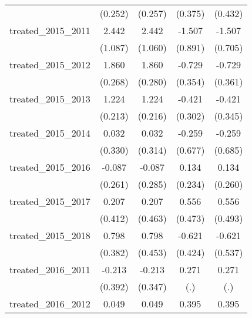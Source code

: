 {\begin{tabular}{l*{4}{c}}
            &     (0.252)         &     (0.257)         &     (0.375)         &     (0.432)         \\
[1em]
treated\_2015\_2011&       2.442\sym{*}  &       2.442\sym{*}  &      -1.507         &      -1.507\sym{*}  \\
            &     (1.087)         &     (1.060)         &     (0.891)         &     (0.705)         \\
[1em]
treated\_2015\_2012&       1.860\sym{***}&       1.860\sym{***}&      -0.729\sym{*}  &      -0.729\sym{*}  \\
            &     (0.268)         &     (0.280)         &     (0.354)         &     (0.361)         \\
[1em]
treated\_2015\_2013&       1.224\sym{***}&       1.224\sym{***}&      -0.421         &      -0.421         \\
            &     (0.213)         &     (0.216)         &     (0.302)         &     (0.345)         \\
[1em]
treated\_2015\_2014&       0.032         &       0.032         &      -0.259         &      -0.259         \\
            &     (0.330)         &     (0.314)         &     (0.677)         &     (0.685)         \\
[1em]
treated\_2015\_2016&      -0.087         &      -0.087         &       0.134         &       0.134         \\
            &     (0.261)         &     (0.285)         &     (0.234)         &     (0.260)         \\
[1em]
treated\_2015\_2017&       0.207         &       0.207         &       0.556         &       0.556         \\
            &     (0.412)         &     (0.463)         &     (0.473)         &     (0.493)         \\
[1em]
treated\_2015\_2018&       0.798\sym{*}  &       0.798         &      -0.621         &      -0.621         \\
            &     (0.382)         &     (0.453)         &     (0.424)         &     (0.537)         \\
[1em]
treated\_2016\_2011&      -0.213         &      -0.213         &       0.271         &       0.271         \\
            &     (0.392)         &     (0.347)         &         (.)         &         (.)         \\
[1em]
treated\_2016\_2012&       0.049         &       0.049         &       0.395         &       0.395         \\

\end{tabular}}
